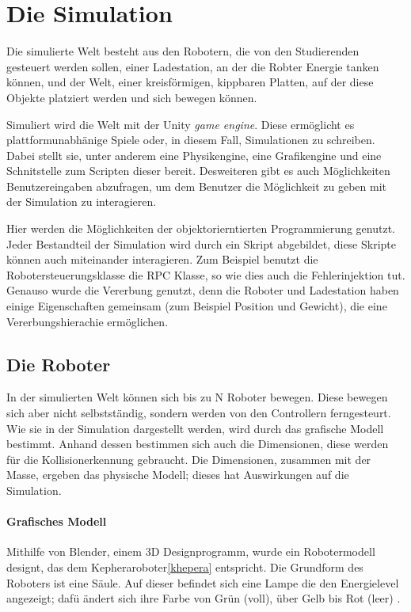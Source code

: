 \clearpage
\section{Die Simulation}
Die simulierte Welt besteht aus den Robotern, die von den Studierenden gesteuert werden sollen, einer Ladestation, an der die Robter Energie tanken k{\"{o}}nnen, und
der Welt, einer kreisf{\"{o}}rmigen, kippbaren Platten, auf der diese Objekte platziert werden und sich bewegen k{\"{o}}nnen.

Simuliert wird die Welt mit der Unity \textit{game engine}. Diese erm{\"{o}}glicht es plattformunabh{\"{a}}nige 
Spiele oder, in diesem Fall, Simulationen zu schreiben. Dabei stellt sie, unter anderem eine Physikengine,
eine Grafikengine und eine Schnitstelle zum Scripten dieser bereit. Desweiteren gibt es auch M{\"{o}}glichkeiten Benutzereingaben
abzufragen, um dem Benutzer die M{\"{o}}glichkeit zu geben mit der Simulation zu interagieren.

Hier werden die M{\"{o}}glichkeiten der objektorierntierten Programmierung genutzt. Jeder Bestandteil der Simulation wird durch
ein Skript abgebildet, diese Skripte k{\"{o}}nnen auch miteinander interagieren. Zum Beispiel benutzt die Robotersteuerungsklasse
die RPC Klasse, so wie dies auch die Fehlerinjektion tut. Genauso wurde die Vererbung genutzt, denn die Roboter und Ladestation haben
einige Eigenschaften gemeinsam (zum Beispiel Position und Gewicht), die eine Vererbungshierachie erm{\"{o}}glichen.

\subsection{Die Roboter}\label{robot}
In der simulierten Welt k{\"{o}}nnen sich bis zu \gls{N} Roboter bewegen. Diese bewegen sich aber nicht selbstst{\"{a}}ndig, sondern werden von den Controllern ferngesteurt.
Wie sie in der Simulation dargestellt werden, wird durch das grafische Modell bestimmt. Anhand dessen bestimmen sich auch die Dimensionen, diese werden f{\"{u}}r die Kollisionerkennung
gebraucht. Die Dimensionen, zusammen mit der Masse, ergeben das physische Modell; dieses hat Auswirkungen auf die Simulation.

\paragraph{Grafisches Modell} Mithilfe von Blender, einem 3D Designprogramm, wurde ein Robotermodell designt, das dem Kepheraroboter\ref{khepera} entspricht. Die Grundform des Roboters ist
eine S{\"{a}}ule. Auf dieser befindet sich eine Lampe die den Energielevel angezeigt; daf{\"{u}} {\"{a}}ndert sich ihre Farbe von Gr{\"{u}}n (voll), {\"{u}}ber Gelb bis Rot (leer) .



